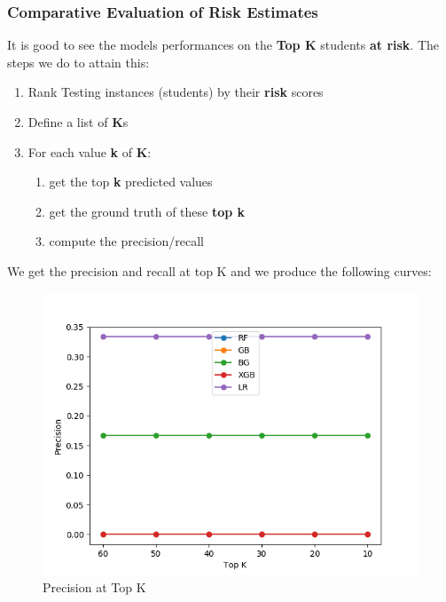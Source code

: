 \documentclass[11pt]{article}
\begin{document}
\subsubsection{Comparative Evaluation of Risk Estimates}
It is good to see the models performances on the \textbf{Top K} students \textbf{at risk}. The steps we do to attain this:
\begin{enumerate}
\item Rank Testing instances (students) by their \textbf{risk} scores
\item Define a list of \textbf{K}s
\item For each value \textbf{k} of \textbf{K}:
\begin{enumerate}
\item get the top \textbf{k} predicted values
\item get the ground truth  of these \textbf{top k}
\item compute the precision/recall
\end{enumerate}
\end{enumerate}
\noindent We get the precision and recall at top K and we produce the following curves:

\begin{figure}[H]
\centering
\includegraphics[scale=0.5]{plots/toydata/precisionstopK.png}
\caption{Precision at Top K}
\label{Fig:prectopk}
\end{figure}
\end{document}
